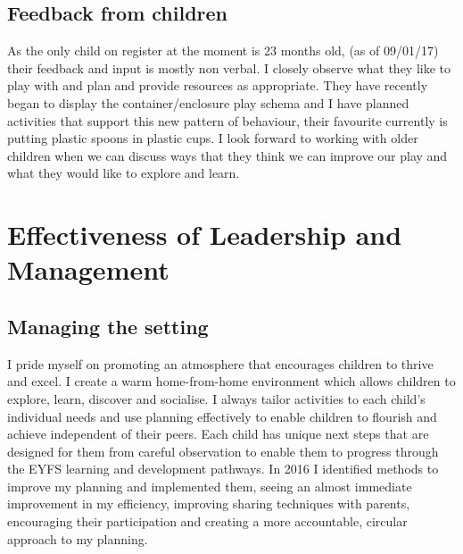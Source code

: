 \documentclass[10pt,a4paper]{report}
\begin{document}
\section{Feedback from children}

As the only child on register at the moment is 23 months old, (as of 09/01/17) their feedback and input is mostly non verbal. I closely observe what they like to play with and plan and provide resources as appropriate. They have recently began to display the container/enclosure play schema and I have planned activities that support this new pattern of behaviour, their favourite currently is putting plastic spoons in plastic cups. I look forward to working with older children when we can discuss ways that they think we can improve our play and what they would like to explore and learn. 

\chapter{Effectiveness of Leadership and Management}

\section{Managing the setting}

I pride myself on promoting an atmosphere that encourages children to thrive and excel. I create a warm home-from-home environment which allows children to explore, learn, discover and socialise. I always tailor activities to each child's individual needs and use planning effectively to enable children to flourish and achieve independent of their peers. Each child has unique next steps that are designed for them from careful observation to enable them to progress through the EYFS learning and development pathways. In 2016 I identified methods to improve my planning and implemented them, seeing an almost immediate improvement in my efficiency, improving sharing techniques with parents, encouraging their participation and creating a more accountable, circular approach to my planning. 
\end{document}
